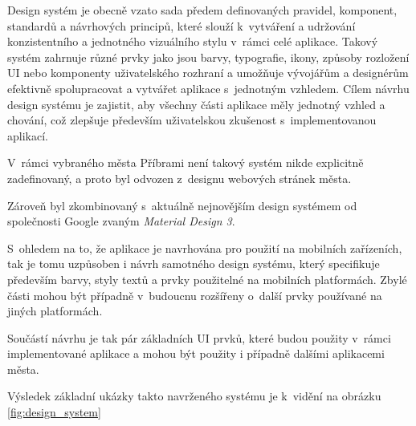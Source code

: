 Design systém je obecně vzato sada předem definovaných pravidel, komponent, standardů a návrhových principů, které slouží k~vytváření a udržování 
konzistentního a jednotného vizuálního stylu v~rámci celé aplikace. Takový systém zahrnuje různé prvky jako jsou barvy, typografie, ikony,
způsoby rozložení UI nebo komponenty uživatelského rozhraní a umožňuje vývojářům a designérům efektivně spolupracovat a vytvářet aplikace s~jednotným 
vzhledem. Cílem návrhu design systému je zajistit, aby všechny části aplikace měly jednotný vzhled a chování, což zlepšuje především uživatelskou 
zkušenost s~implementovanou aplikací. 



V~rámci vybraného města Příbrami není takový systém nikde explicitně zadefinovaný, a proto byl odvozen z~designu webových stránek města.

Zároveň byl zkombinovaný s~aktuálně nejnovějším design systémem od společnosti Google zvaným \textit{Material Design 3}.

S~ohledem na to, že aplikace je navrhována pro použití na mobilních zařízeních, tak je tomu uzpůsoben i návrh samotného design systému, který
specifikuje především barvy, styly textů a prvky použitelné na mobilních platformách. Zbylé části mohou být případně v~budoucnu rozšířeny o~další prvky 
používané na jiných platformách.

Součástí návrhu je tak pár základních UI prvků, které budou použity v~rámci implementované aplikace a mohou být použity i případně dalšími 
aplikacemi města.

Výsledek základní ukázky takto navrženého systému je k~vidění na obrázku \ref{fig:design_system}

\bigskip

